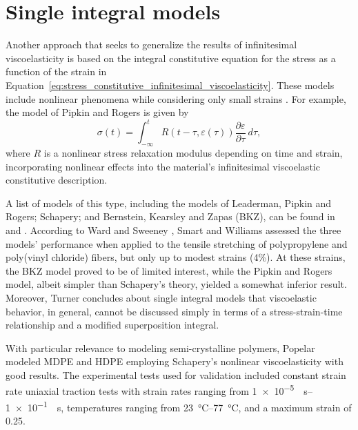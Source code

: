 \section{Single integral models}
Another approach that seeks to generalize the results of infinitesimal viscoelasticity is based on the integral constitutive equation for the stress as a function of the strain in Equation~\eqref{eq:stress_constitutive_infinitesimal_viscoelasticity}.
These models include nonlinear phenomena while considering only small strains \citep{wardIntroductionMechanicalProperties2004}.
For example, the model of Pipkin and Rogers is given by \citep{wardIntroductionMechanicalProperties2004}
\begin{equation}
	\sigma(t) = \int_{-\infty}^t R(t-\tau, \varepsilon(\tau))\frac{\partial \varepsilon}{\partial \tau}\ d\tau,
\end{equation}
where $R$ is a nonlinear stress relaxation modulus depending on time and strain, incorporating nonlinear effects into the material's infinitesimal viscoelastic constitutive description.

A list of models of this type, including the models of Leaderman, Pipkin and Rogers; Schapery; and Bernstein, Kearsley and Zapas (BKZ), can be found in \cite{wardIntroductionMechanicalProperties2004} and \cite{malkinRheologyConceptsMethods2017}.
According to Ward and Sweeney \citep{wardIntroductionMechanicalProperties2004}, Smart and Williams \citep{smartComparisonSingleintegralNonlinear1972} assessed the three models' performance when applied to the tensile stretching of polypropylene and poly(vinyl chloride) fibers, but only up to modest strains (4\%).
At these strains, the BKZ model proved to be of limited interest, while the Pipkin and Rogers model, albeit simpler than Schapery's theory, yielded a somewhat inferior result.
Moreover, Turner \citep{turnerStrainResponsePlastics1966} concludes about single integral models that viscoelastic behavior, in general, cannot be discussed simply in terms of a stress-strain-time relationship and a modified superposition integral.

With particular relevance to modeling semi-crystalline polymers, Popelar \citep{popelarViscoelasticMaterialCharacterization1990} modeled MDPE and HDPE employing Schapery's nonlinear viscoelasticity with good results.
The experimental tests used for validation included constant strain rate uniaxial traction tests with strain rates ranging from \SIrange{1e-5}{1e-1}{\per\second}, temperatures ranging from \SIrange{23}{77}{\celsius}, and a maximum strain of 0.25.

